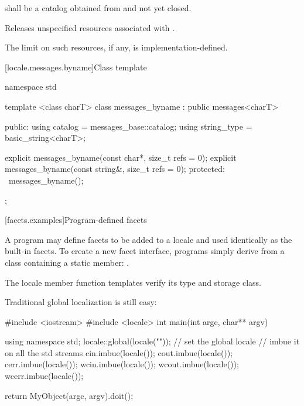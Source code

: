 \begin{itemdescr}
\pnum
\requires
{} shall be a catalog obtained from
and not yet closed.

\pnum
\effects
Releases unspecified resources associated with  .

\pnum
\remarks
The limit on such resources, if any, is implementation-defined.
\end{itemdescr}

[locale.messages.byname]{Class template }

%
\begin{codeblock}
namespace std {
  template <class charT>
  class messages_byname : public messages<charT> {
  public:
    using catalog     = messages_base::catalog;
    using string_type = basic_string<charT>;

    explicit messages_byname(const char*, size_t refs = 0);
    explicit messages_byname(const string&, size_t refs = 0);
  protected:
    ~messages_byname();
  };
}
\end{codeblock}

[facets.examples]{Program-defined facets}

\pnum
A \Cpp program may define facets to be added to a locale and used identically as
the built-in facets.
To create a new facet interface, \Cpp programs simply derive from
a class containing a static member:
.

\pnum
\begin{note}
The locale member function templates verify its type and storage class.
\end{note}

\pnum
\begin{example}
Traditional global localization is still easy:

\begin{codeblock}
#include <iostream>
#include <locale>
int main(int argc, char** argv) {
  using namespace std;
  locale::global(locale(""));           // set the global locale
                                        // imbue it on all the std streams
  cin.imbue(locale());
  cout.imbue(locale());
  cerr.imbue(locale());
  wcin.imbue(locale());
  wcout.imbue(locale());
  wcerr.imbue(locale());

  return MyObject(argc, argv).doit();
}
\end{codeblock}
\end{example}

